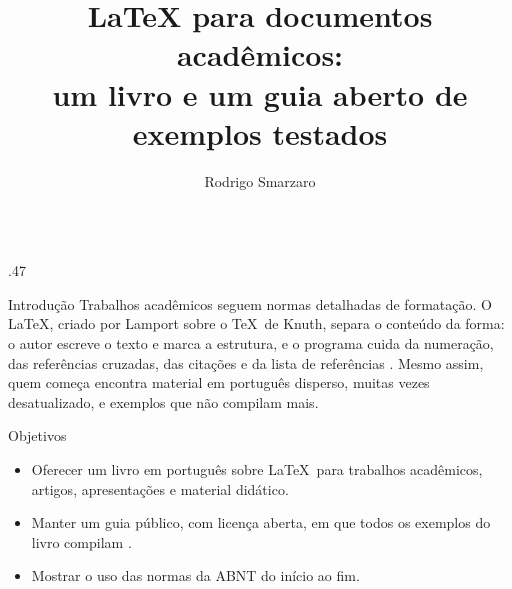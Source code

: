 \documentclass[final]{beamer}
\title{LaTeX para documentos acadêmicos:\\ um livro e um guia aberto de
  exemplos testados}
\author{Rodrigo Smarzaro}
\institute{Departamento de Exemplo, Universidade Exemplo
  (autor@exemplo.edu.br)}
\renewcommand{\large}{\fontsize{40}{48}\selectfont}
\newlength{\topo}
\begin{document}
\begin{frame}[t]
\begin{center}
  \vspace{\topo}
  {\fontsize{72}{84}\selectfont\bfseries\color{eventoescuro}\inserttitle\par}
  \vspace{1.5cm}
  {\large\insertauthor\par\insertinstitute\par}
\end{center}

\begin{columns}[t, totalwidth=\linewidth]
\begin{column}{.47\linewidth}
  \begin{block}{Introdução}
    Trabalhos acadêmicos seguem normas detalhadas de formatação. O \LaTeX,
    criado por Lamport sobre o \TeX\ de Knuth, separa o conteúdo da forma:
    o autor escreve o texto e marca a estrutura, e o programa cuida da
    numeração, das referências cruzadas, das citações e da lista de
    referências \parencite{Lamport1994}. Mesmo assim, quem começa encontra
    material em português disperso, muitas vezes desatualizado, e exemplos
    que não compilam mais.
  \end{block}

  \begin{block}{Objetivos}
    \begin{itemize}
      \item Oferecer um livro em português sobre \LaTeX\ para trabalhos
        acadêmicos, artigos, apresentações e material didático.
      \item Manter um guia público, com licença aberta, em que todos os
        exemplos do livro compilam \parencite{latexacademico}.
      \item Mostrar o uso das normas da ABNT do início ao fim.
    \end{itemize}
  \end{block}


\end{column}
\end{columns}
\end{frame}
\end{document}
